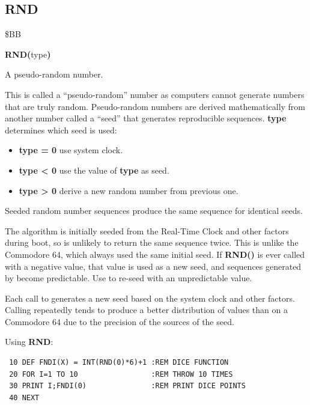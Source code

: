 
\newpage
\subsection{RND}
\begin{description}[leftmargin=2cm,style=nextline]
\item [Token:] \$BB
\item [Format:] {\bf RND(}type{\bf)}
\item [Returns:] A pseudo-random number.

               This is called a ``pseudo-random'' number as computers cannot
               generate numbers that are truly random. Pseudo-random numbers
               are derived mathematically from another number called a ``seed''
               that generates reproducible sequences. {\bf type} determines
               which seed is used:

                \begin{itemize}
                    \item {\bf type = 0} use system clock.
                    \item {\bf type < 0} use the value of {\bf type} as seed.
                    \item {\bf type > 0} derive a new random number from previous one.
                \end{itemize}

\item [Remarks:] Seeded random number sequences produce the same
                 sequence for identical seeds.

                 The algorithm is initially seeded from the Real-Time Clock
                 and other factors during boot, so  is
                 unlikely to return the same sequence twice. This is unlike
                 the Commodore 64, which always used the same initial seed. If
                 {\bf RND()} is ever called with a negative value, that value
                 is used as a new seed, and sequences generated by
                  become predictable. Use
                  to re-seed with an unpredictable value.

                 Each call to  generates a new seed based
                 on the system clock and other factors. Calling
                  repeatedly tends to produce a better
                 distribution of values than on a Commodore 64 due to the
                 precision of the sources of the seed.

\item [Example:] Using {\bf RND}:
\begin{tcolorbox}[colback=black,coltext=white]
\verbatimfont{\codefont}
\begin{verbatim}
 10 DEF FNDI(X) = INT(RND(0)*6)+1 :REM DICE FUNCTION
 20 FOR I=1 TO 10                 :REM THROW 10 TIMES
 30 PRINT I;FNDI(0)               :REM PRINT DICE POINTS
 40 NEXT
\end{verbatim}
\end{tcolorbox}
\end{description}

